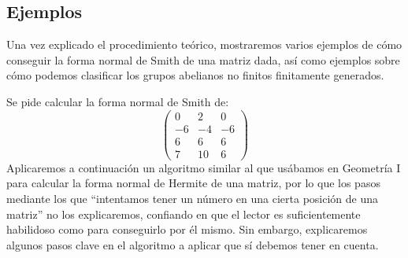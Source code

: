 \subsection{Ejemplos}
\noindent
Una vez explicado el procedimiento teórico, mostraremos varios ejemplos de cómo conseguir la forma normal de Smith de una matriz dada, así como ejemplos sobre cómo podemos clasificar los grupos abelianos no finitos finitamente generados.

\begin{ejemplo}
    Se pide calcular la forma normal de Smith de:
    \begin{equation*}
        \left(\begin{array}{cccc}
            0 & 2 & 0 \\
            -6 & -4 & -6 \\
            6 & 6 & 6 \\
            7 & 10 & 6  
        \end{array}\right)
    \end{equation*}
    Aplicaremos a continuación un algoritmo similar al que usábamos en Geometría I para calcular la forma normal de Hermite de una matriz, por lo que los pasos mediante los que ``intentamos tener un número en una cierta posición de una matriz'' no los explicaremos, confiando en que el lector es suficientemente habilidoso como para conseguirlo por él mismo. Sin embargo, explicaremos algunos pasos clave en el algoritmo a aplicar que sí debemos tener en cuenta.\\


\end{ejemplo}
